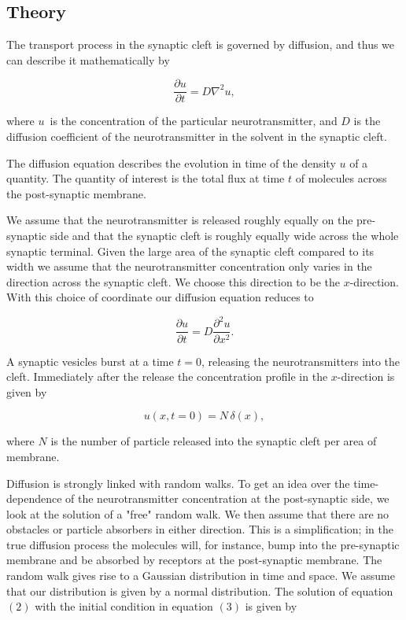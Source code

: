 \documentclass[a4paper,12pt, english]{article}
\begin{document}
\subsection*{Theory}

The transport process in the synaptic cleft is governed by diffusion, and thus we can describe it mathematically by

\begin{equation}
\frac{\partial u}{\partial t} = D \nabla^2 u,
\end{equation}

where $u\,$ is the concentration of the particular neurotransmitter, and $D$ is the diffusion coefficient of the neurotransmitter in the solvent in the  synaptic cleft.

The diffusion equation describes the evolution in time of the density $u$ of a quantity. The quantity of interest is the total flux at time $t$ of molecules across the post-synaptic membrane. 

We assume that the neurotransmitter is released roughly equally on the pre-synaptic side and that the synaptic cleft is roughly equally wide across the whole synaptic terminal. Given the large area of the synaptic cleft compared to its width we assume that the neurotransmitter concentration only varies in the direction across the synaptic cleft. We choose this direction to be the $x$-direction. With this choice of coordinate our diffusion equation reduces to 

\begin{equation}
\frac{\partial u}{\partial t} = D \frac{\partial^2 u}{\partial x^2}.
\end{equation}\newline  

A synaptic vesicles burst at a time $t = 0$, releasing the neurotransmitters into the cleft. 
Immediately after the release the concentration profile in the $x$-direction is given by

\begin{equation}
u(x,t=0) = N \, \delta(x),
\label{eq:initial_condition}
\end{equation}

where $N$ is the number of particle released into the synaptic cleft
per area of membrane.

Diffusion is strongly linked with random walks. To get an idea over the time-dependence of the neurotransmitter concentration at the post-synaptic side, we look at the solution of a "free" random walk. We then assume that there are no obstacles or particle absorbers in either direction. This is a simplification; in the true diffusion process the molecules will, for instance, bump into the pre-synaptic membrane and be absorbed by receptors at the post-synaptic membrane.
The random walk gives rise to a Gaussian distribution in time and space. We assume that our distribution is given by a normal distribution. The solution of equation $(2)$ with the initial condition in equation $(3)$ is given by
\end{document}
